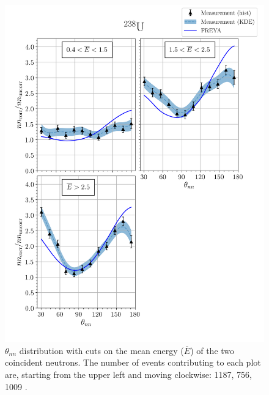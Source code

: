 \begin{figure}
\centering
    \includegraphics[width = 1.1\textwidth]{Content/Results/FinalDUResultw_freya1KDE.png}
    \caption{$\theta_{nn}$ distribution with cuts on the mean energy ($\overline{E}$) of the two coincident neutrons.
    The number of events contributing to each plot are, starting from the upper left and moving clockwise: 1187, 756, 1009 .}
    \label{fig:DU(1)}
\end{figure}
